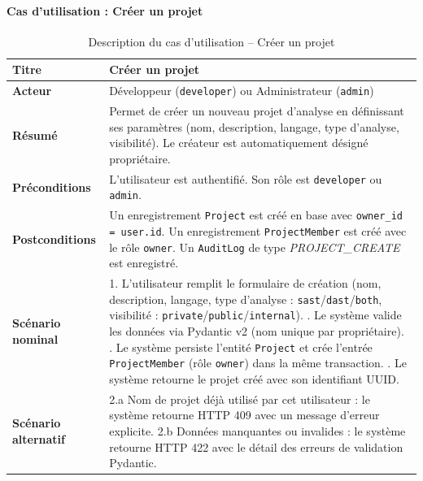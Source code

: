 \paragraph{Cas d'utilisation : Créer un projet}
\begin{table}[H]
\centering
\caption{Description du cas d'utilisation -- Créer un projet}
\label{tab:uc-create-project}
\small
\renewcommand{\arraystretch}{1.3}
\begin{tabularx}{\textwidth}{>{\bfseries}p{3.5cm} X}
\hline
Titre & Créer un projet \\
\hline
Acteur & Développeur (\texttt{developer}) ou Administrateur (\texttt{admin}) \\
\hline
Résumé & Permet de créer un nouveau projet d'analyse en définissant ses paramètres (nom, description, langage, type d'analyse, visibilité). Le créateur est automatiquement désigné propriétaire. \\
\hline
Préconditions & L'utilisateur est authentifié. Son rôle est \texttt{developer} ou \texttt{admin}. \\
\hline
Postconditions & Un enregistrement \texttt{Project} est créé en base avec \texttt{owner\_id = user.id}. Un enregistrement \texttt{ProjectMember} est créé avec le rôle \texttt{owner}. Un \texttt{AuditLog} de type \textit{PROJECT\_CREATE} est enregistré. \\
\hline
Scénario nominal &
1. L'utilisateur remplit le formulaire de création (nom, description, langage, type d'analyse : \texttt{sast}/\texttt{dast}/\texttt{both}, visibilité : \texttt{private}/\texttt{public}/\texttt{internal}). \newline
2. Le système valide les données via Pydantic v2 (nom unique par propriétaire). \newline
3. Le système persiste l'entité \texttt{Project} et crée l'entrée \texttt{ProjectMember} (rôle \texttt{owner}) dans la même transaction. \newline
4. Le système retourne le projet créé avec son identifiant UUID. \\
\hline
Scénario alternatif &
2.a Nom de projet déjà utilisé par cet utilisateur : le système retourne HTTP 409 avec un message d'erreur explicite. \newline
2.b Données manquantes ou invalides : le système retourne HTTP 422 avec le détail des erreurs de validation Pydantic. \\
\hline
\end{tabularx}
\end{table}

